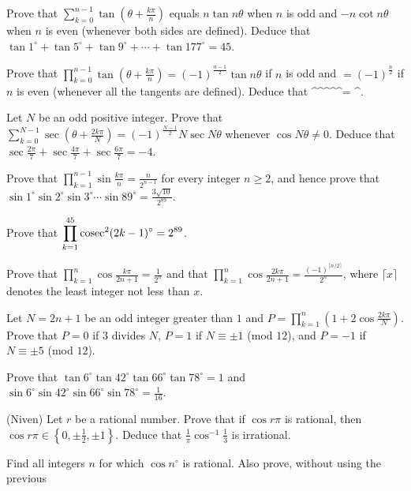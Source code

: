 \item Prove that $\displaystyle\sum_{k = 0}^{n - 1}\tan\left(\theta + \frac{k\pi}{n}\right)$ equals
  $n\tan n\theta$ when $n$ is odd and $-n\cot n\theta$ when $n$ is even (whenever both sides are defined). Deduce
  that $\tan1^\circ + \tan5^\circ + \tan9^\circ + \cdots + \tan177^\circ = 45$.
\item Prove that $\displaystyle\prod_{k = 0}^{n - 1}\tan\left(\theta + \frac{k\pi}{n}\right) = (-1)^{\frac{n
      - 1}{2}}\tan n\theta$ if $n$ is odd and $= (-1)^{\frac{n}{2}}$ if $n$ is even (whenever all the tangents
  are defined). Deduce that
  \startformula
    ^\circ{}^\circ{}^\circ{}^\circ{}^\circ = ^\circ.
  \stopformula
\item Let $N$ be an odd positive integer. Prove that $\displaystyle\sum_{k = 0}^{N - 1}\sec\left(\theta
  + \frac{2k\pi}{N}\right) = (-1)^{\frac{N - 1}{2}}N\sec N\theta$ whenever $\cos N\theta\neq 0$. Deduce that
  $\sec\frac{2\pi}{7} + \sec\frac{4\pi}{7} + \sec\frac{6\pi}{7} = -4$.
\item Prove that $\displaystyle\prod_{k = 1}^{n - 1}\sin\frac{k\pi}{n} = \frac{n}{2^{n - 1}}$ for every
  integer $n\geq 2$, and hence prove that $\sin1^\circ\sin2^\circ\sin3^\circ\cdots\sin89^\circ =
  \frac{3\sqrt{10}}{2^{89}}$.
\item Prove that $\displaystyle\prod_{k = 1}^{45}{\rm cosec}^2(2k - 1)^\circ = 2^{89}$.
\item Prove that $\displaystyle\prod_{k = 1}^{n}\cos\frac{k\pi}{2n + 1} = \frac{1}{2^n}$ and that
  $\displaystyle\prod_{k = 1}^{n}\cos\frac{2k\pi}{2n + 1} = \frac{(-1)^{\lceil n/2\rceil}}{2^n}$, where $\lceil
  x\rceil$ denotes the least integer not less than $x$.
\item Let $N = 2n + 1$ be an odd integer greater than $1$ and $P = \displaystyle\prod_{k = 1}^{n}\left(1
  + 2\cos\frac{2k\pi}{N}\right)$. Prove that $P = 0$ if $3$ divides $N$, $P = 1$ if $N\equiv\pm 1$ (mod $12$),
  and $P = -1$ if $N\equiv\pm 5$ (mod $12$).
\item Prove that $\tan6^\circ\tan42^\circ\tan66^\circ\tan78^\circ = 1$ and $\sin6^\circ\sin42^\circ\sin66^\circ
  \sin78^\circ = \frac{1}{16}$.
\item (Niven) Let $r$ be a rational number. Prove that if $\cos r\pi$ is rational, then $\cos r\pi\in\left\{0,
  \pm\frac{1}{2}, \pm 1\right\}$. Deduce that $\frac{1}{\pi}\cos^{-1}\frac{1}{3}$ is irrational.
\item Find all integers $n$ for which $\cos n^\circ$ is rational. Also prove, without using the previous
